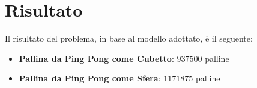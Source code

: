 
\section{Risultato}

Il risultato del problema, in base al modello adottato, è il seguente:

\begin{itemize}
    \item \textbf{Pallina da Ping Pong come Cubetto}: $937500$ palline
    \item \textbf{Pallina da Ping Pong come Sfera}: $1171875$ palline
\end{itemize}



